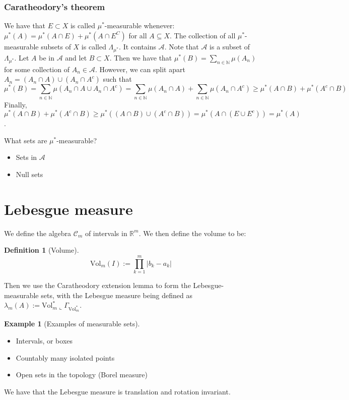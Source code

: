 \documentclass{article}
\newtheorem{definition}[theorem]{Definition}
\theoremstyle{definition}
\newtheorem{example}[theorem]{Example}
\numberwithin{theorem}{section}
\numberwithin{equation}{section}
\newcommand{\alg}{\mathcal{A}}
\newcommand{\sigmes}{\Lambda_{\mu^*}}
\begin{document}
\subsubsection{Caratheodory's theorem}
We have that $E \subset X$ is called $\mu^*$-measurable whenever:
$\mu^*(A) = \mu^*(A \cap E) + \mu^*(A \cap E^C)$ for all $A \subseteq X$. The collection of all $\mu^*$-measurable subsets of $X$ is called $\sigmes$. It contains $\alg$.
Note that $ \alg$ is a subset of $\sigmes$. Let $A$ be in $\alg$ and let $B \subset X$. Then we have that $\mu^*(B) = \sum_{n \in \mathbb{N}}\mu(A_n)$ for some collection of $A_n \in \alg$. However, we can split apart $A_n = (A_n \cap A) \cup (A_n \cap A^c)$ such that
\begin{equation}
	\mu^*(B) = \sum_{n \in \mathbb{N}}\mu(A_n\cap A \cup A_n \cap A^c) = \sum_{n \in \mathbb{N}} \mu(A_n \cap A) + \sum_{n \in \mathbb{N}} \mu(A_n \cap A^c) \geq \mu^*(A \cap B) + \mu^*(A^c \cap B)
\end{equation}
 Finally, $\mu^*(A \cap B) + \mu^*(A^c \cap B) \geq \mu^*((A \cap B) \cup (A^c \cap B)) = \mu^*(A \cap (E \cup E^c)) = \mu^*(A)$. 

What sets are $\mu^*$-measurable?
\begin{itemize}
	\item Sets in $\alg$
	\item Null sets
\end{itemize}

\section{Lebesgue measure}
We define the algebra $\mathcal{C}_m$ of intervals in $\mathbb{R}^m$. We then define the volume to be:
\begin{definition}[Volume]
	\begin{equation*}
		\text{Vol}_m(I) := \prod_{k = 1}^m |b_k - a_k|
	\end{equation*}
\end{definition}

Then we use the Caratheodory extension lemma to form the Lebesgue-measurable sets, with the Lebesgue measure being defined as $\lambda_m(A) := \text{Vol}_m^*\llcorner \Gamma_{\text{Vol}_m^*}$.

\begin{example}[Examples of measurable sets]
	\begin{itemize}
		\item Intervals, or boxes
		\item Countably many isolated points
		\item Open sets in the topology (Borel measure)
	\end{itemize}
\end{example}
We have that the Lebesgue measure is translation and rotation invariant.
\end{document}
